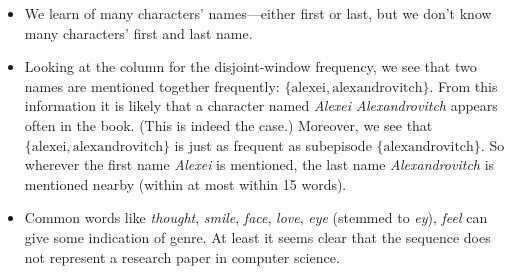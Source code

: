 \begin{itemize}
\item We learn of many characters' names---either first or last, but we don't know many characters' first and last name.
\item Looking at the column for the disjoint-window frequency, we see that two names are mentioned together frequently: $ \{ \text{alexei}, \text{alexandrovitch} \} $. From this information it is likely that a character named \emph{Alexei Alexandrovitch} appears often in the book. (This is indeed the case.) Moreover, we see that $ \{ \text{alexei}, \text{alexandrovitch} \} $ is just as frequent as subepisode $ \{ \text{alexandrovitch} \} $. So wherever the first name \emph{Alexei} is mentioned, the last name \emph{Alexandrovitch} is mentioned nearby (within at most within 15 words).
\item Common words like \emph{thought}, \emph{smile}, \emph{face}, \emph{love}, \emph{eye} (stemmed to \emph{ey}), \emph{feel} can give some indication of genre. At least it seems clear that the sequence does not represent a research paper in computer science.

\end{itemize}


